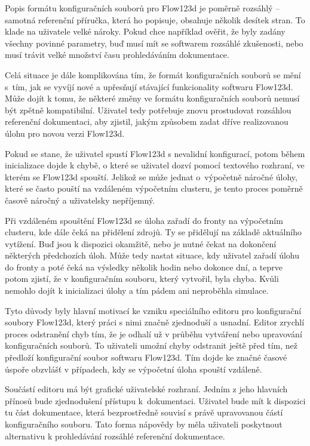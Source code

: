 \documentclass[FM,DP]{tulthesis}
\begin{document}
Popis formátu konfiguračních souborů pro Flow123d je poměrně rozsáhlý -- samotná referenční příručka, která ho popisuje, obsahuje několik desítek stran. To klade na uživatele velké nároky. Pokud chce například ověřit, že byly zadány všechny povinné parametry, buď musí mít se softwarem rozsáhlé zkušenosti, nebo musí trávit velké množství času prohledáváním dokumentace. 

Celá situace je dále komplikována tím, že formát konfiguračních souborů se mění s~tím, jak se vyvíjí nové a upřesňují stávající funkcionality softwaru Flow123d. Může dojít k tomu, že některé změny ve formátu konfiguračních souborů nemusí být zpětně kompatibilní. Uživatel tedy potřebuje znovu prostudovat rozsáhlou referenční dokumentaci, aby zjistil, jakým způsobem zadat dříve realizovanou úlohu pro novou verzi Flow123d.

Pokud se stane, že uživatel spustí Flow123d s nevalidní konfigurací, potom během inicializace dojde k chybě, o které se uživatel dozví pomocí textového rozhraní, ve kterém se Flow123d spouští. Jelikož se může jednat o~výpočetně náročné úlohy, které se často pouští na vzdáleném výpočetním clusteru, je tento proces poměrně časově náročný a uživatelsky nepříjemný.

Při vzdáleném spouštění Flow123d se úloha zařadí do fronty na výpočetním clusteru, kde dále čeká na přidělení zdrojů. Ty se přidělují na základě aktuálního vytížení. Buď jsou k dispozici okamžitě, nebo je nutné čekat na dokončení některých předchozích úloh. Může tedy nastat situace, kdy uživatel zařadí úlohu do fronty a poté čeká na výsledky několik hodin nebo dokonce dní, a teprve potom zjistí, že v konfiguračním souboru, který vytvořil, byla chyba. Kvůli nemohlo dojít k inicializaci úlohy a tím pádem ani neproběhla simulace.

Tyto důvody byly hlavní motivací ke vzniku speciálního editoru pro konfigurační soubory Flow123d, který práci s nimi značně zjednoduší a usnadní. Editor zrychlí proces odstranění chyb tím, že je odhalí už v průběhu vytváření nebo upravování konfiguračních souborů. To uživateli umožní chyby odstranit ještě před tím, než předloží konfigurační soubor softwaru Flow123d. Tím dojde ke značné časové úspoře obzvlášť v případech, kdy se výpočetní úloha spouští vzdáleně.

Součástí editoru má být grafické uživatelské rozhraní. Jedním z jeho hlavních přínosů bude zjednodušení přístupu k~dokumentaci. Uživatel bude mít k dispozici tu část dokumentace, která bezprostředně souvisí s právě upravovanou částí konfiguračního souboru. Tato forma nápovědy by měla uživateli poskytnout alternativu k prohledávání rozsáhlé referenční dokumentace.
\end{document}
